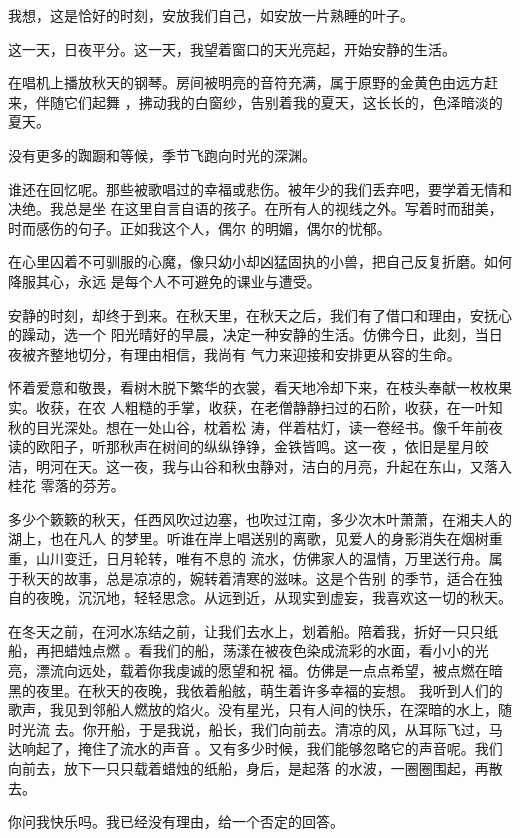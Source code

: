 \documentclass[12pt,a4paper]{article}
\begin{document}
		我想，这是恰好的时刻，安放我们自己，如安放一片熟睡的叶子。


		这一天，日夜平分。这一天，我望着窗口的天光亮起，开始安静的生活。

		在唱机上播放秋天的钢琴。房间被明亮的音符充满，属于原野的金黄色由远方赶来，伴随它们起舞
	，拂动我的白窗纱，告别着我的夏天，这长长的，色泽暗淡的夏天。

		没有更多的踟蹰和等候，季节飞跑向时光的深渊。

		谁还在回忆呢。那些被歌唱过的幸福或悲伤。被年少的我们丢弃吧，要学着无情和决绝。我总是坐
	在这里自言自语的孩子。在所有人的视线之外。写着时而甜美，时而感伤的句子。正如我这个人，偶尔
	的明媚，偶尔的忧郁。

		在心里囚着不可驯服的心魔，像只幼小却凶猛固执的小兽，把自己反复折磨。如何降服其心，永远
	是每个人不可避免的课业与遭受。

		安静的时刻，却终于到来。在秋天里，在秋天之后，我们有了借口和理由，安抚心的躁动，选一个
	阳光晴好的早晨，决定一种安静的生活。仿佛今日，此刻，当日夜被齐整地切分，有理由相信，我尚有
	气力来迎接和安排更从容的生命。

		怀着爱意和敬畏，看树木脱下繁华的衣裳，看天地冷却下来，在枝头奉献一枚枚果实。收获，在农
	人粗糙的手掌，收获，在老僧静静扫过的石阶，收获，在一叶知秋的目光深处。想在一处山谷，枕着松
	涛，伴着枯灯，读一卷经书。像千年前夜读的欧阳子，听那秋声在树间的纵纵铮铮，金铁皆鸣。这一夜
	，依旧是星月皎洁，明河在天。这一夜，我与山谷和秋虫静对，洁白的月亮，升起在东山，又落入桂花
	零落的芬芳。

		多少个簌簌的秋天，任西风吹过边塞，也吹过江南，多少次木叶萧萧，在湘夫人的湖上，也在凡人
	的梦里。听谁在岸上唱送别的离歌，见爱人的身影消失在烟树重重，山川变迁，日月轮转，唯有不息的
	流水，仿佛家人的温情，万里送行舟。属于秋天的故事，总是凉凉的，婉转着清寒的滋味。这是个告别
	的季节，适合在独自的夜晚，沉沉地，轻轻思念。从远到近，从现实到虚妄，我喜欢这一切的秋天。

		在冬天之前，在河水冻结之前，让我们去水上，划着船。陪着我，折好一只只纸船，再把蜡烛点燃
	。看我们的船，荡漾在被夜色染成流彩的水面，看小小的光亮，漂流向远处，载着你我虔诚的愿望和祝
	福。仿佛是一点点希望，被点燃在暗黑的夜里。在秋天的夜晚，我依着船舷，萌生着许多幸福的妄想。
	我听到人们的歌声，我见到邻船人燃放的焰火。没有星光，只有人间的快乐，在深暗的水上，随时光流
	去。你开船，于是我说，船长，我们向前去。清凉的风，从耳际飞过，马达响起了，掩住了流水的声音
	。又有多少时候，我们能够忽略它的声音呢。我们向前去，放下一只只载着蜡烛的纸船，身后，是起落
	的水波，一圈圈围起，再散去。

		你问我快乐吗。我已经没有理由，给一个否定的回答。
\end{document}
